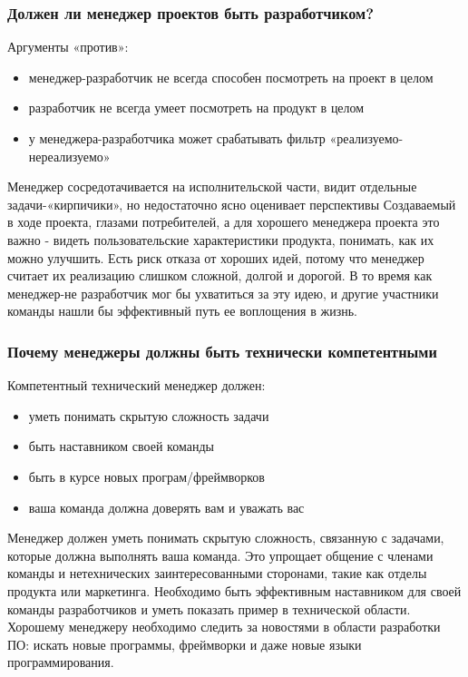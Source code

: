 \documentclass{../industrial-development}
\begin{document}
\begin{frame} \frametitle{Должен ли менеджер проектов быть разработчиком?}
	\begin{block}{Аргументы «против»:}
		\begin{itemize}
			\item менеджер\nobreakdash-разработчик не всегда способен посмотреть на проект в целом
			\item разработчик не всегда умеет посмотреть на продукт в целом
			\item у менеджера-разработчика может срабатывать фильтр «реализуемо\nobreakdash-нереализуемо»
		\end{itemize}
	\end{block}
\end{frame}
\lecturenotes
Менеджер сосредотачивается на исполнительской части, видит отдельные задачи\nobreakdash-«кирпичики», но недостаточно ясно оценивает перспективы
Создаваемый в ходе проекта, глазами потребителей, а для хорошего менеджера проекта это важно \nobreakdash- видеть пользовательские характеристики продукта, понимать, как их можно улучшить.
Есть риск отказа от хороших идей, потому что менеджер считает их реализацию слишком сложной, долгой и дорогой. В то время как менеджер-не разработчик мог бы ухватиться за эту идею, и другие участники команды нашли бы эффективный путь ее воплощения в жизнь.
~\cite{Best_qualities_for_IT-manager}

\begin{frame} \frametitle{Почему менеджеры должны быть технически компетентными}
Компетентный технический менеджер должен:
\begin{itemize}
	\item уметь понимать скрытую сложность задачи
	\item быть наставником своей команды
	\item быть в курсе новых програм/фреймворков
	\item ваша команда должна доверять вам и уважать вас
\end{itemize}
\end{frame}
\lecturenotes
Менеджер должен уметь понимать скрытую сложность, связанную с задачами, которые должна выполнять ваша команда. Это упрощает общение с членами команды и нетехнических заинтересованными сторонами, такие как отделы продукта или маркетинга. 
Необходимо быть эффективным наставником для своей команды разработчиков и уметь показать пример в технической области.
Хорошему менеджеру необходимо следить за новостями в области разработки ПО: искать новые программы, фреймворки и даже новые языки программирования.
~\cite{From_engineer_to_manager_keeping_your_technical_skills}
\end{document}
